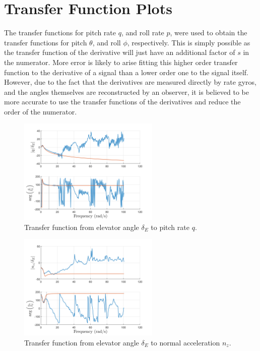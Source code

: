 \documentclass{article}
\begin{document}
\section{Transfer Function Plots}

The transfer functions for pitch rate $q$, and roll rate $p$, were used to obtain the transfer functions for pitch $\theta$, and roll $\phi$, respectively.
This is simply possible as the transfer function of the derivative will just have an additional factor of $s$ in the numerator.
More error is likely to arise fitting this higher order transfer function to the derivative of a signal than a lower order one to the signal itself.
However, due to the fact that the derivatives are measured directly by rate gyros, and the angles themselves are reconstructed by an observer,
it is believed to be more accurate to use the transfer functions of the derivatives and reduce the order of the numerator.

\begin{figure}[H]
    \centering
    \includegraphics[width=0.6\textwidth]{elev_to_pitchrate.png}
    \caption{Transfer function from elevator angle $\delta_E$ to pitch rate $q$.}
    \label{fig:elev_to_pitchrate}
\end{figure}
  
\begin{figure}[H]
      \centering
      \includegraphics[width=0.6\textwidth]{elevator_to_normal.png}
      \caption{Transfer function from elevator angle $\delta_E$ to normal acceleration $n_z$.}
      \label{fig:elevator_to_normal}
\end{figure}
  
\end{document}
